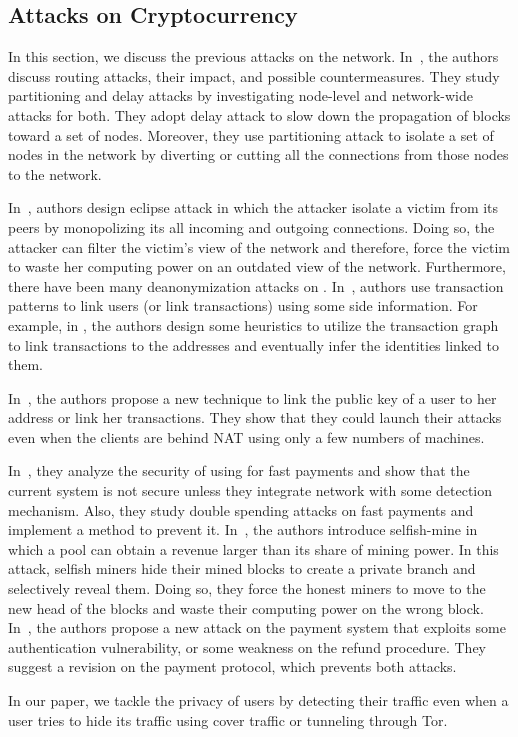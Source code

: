   \subsection{Attacks on \bc Cryptocurrency}
 In this section, we discuss the previous attacks on the \bc network. 
 In~\cite{hijack}, the authors discuss routing attacks, their impact, and possible countermeasures. They study partitioning and delay attacks by investigating node-level and network-wide attacks for both. They adopt delay attack to slow down the propagation of blocks toward a set of nodes. Moreover, they use partitioning attack to isolate a set of nodes in the \bc network by diverting or cutting all the connections from those nodes to the network.
 
In~\cite{eclipse}, authors design eclipse attack in which the attacker isolate a victim from its peers by monopolizing its all incoming and outgoing connections. Doing so, the attacker can filter the victim's view of the network and therefore, force the victim to waste her computing power on an outdated view of the network. Furthermore, there have been many deanonymization attacks on \bc. 
In~\cite{analysis_anon, privacy_anon, struct, fist, quant}, authors use \bc transaction patterns
to link users (or link transactions) using some side information. For example, in \cite{fist}, the authors design some heuristics to utilize the transaction graph to link transactions to the addresses and eventually infer the identities linked to them.

In~\cite{deanom1}, the authors propose a new technique to link the public key of a user to her address or link her transactions. They show that they could launch their attacks even when the clients are behind NAT using only a few numbers of machines.
 
 In~\cite{double}, they analyze the security of using \bc for fast payments and show that the current \bc system is not secure unless they integrate \bc network with some detection mechanism.
 Also, they study double spending attacks on fast payments and  implement a method to prevent it.
 In~\cite{majority}, the authors introduce selfish-mine in which a pool can obtain a revenue larger than its share of mining power. In this attack, selfish miners hide their mined blocks to create a private branch and selectively reveal them. Doing so, they force the honest miners to move to the new head of the blocks and waste their computing power on the wrong block.
In~\cite{refund}, the authors propose a new attack on the \bc payment system that exploits some authentication vulnerability, or some weakness on the refund procedure. They suggest a revision on the \bc payment protocol, which prevents both attacks.

In our paper, we tackle the privacy of \bc users by detecting their \bc traffic even when
a user tries to hide its \bc traffic using cover traffic or tunneling through Tor. %



